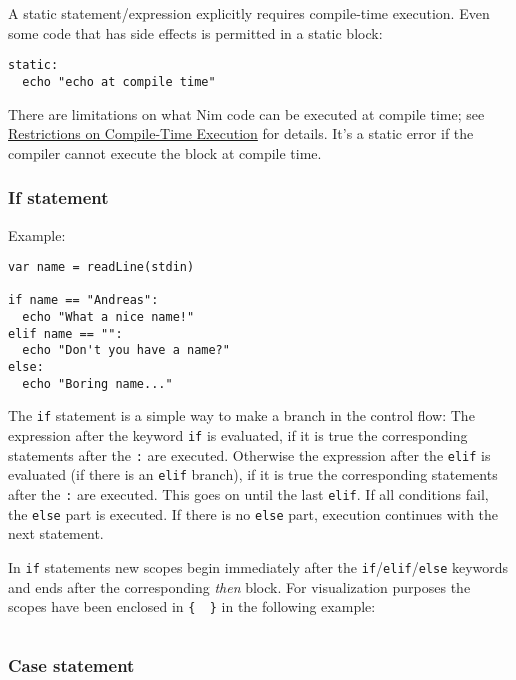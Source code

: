 A static statement/expression explicitly requires compile-time
execution. Even some code that has side effects is permitted in a static
block:

\begin{verbatim}
static:
  echo "echo at compile time"
\end{verbatim}

There are limitations on what Nim code can be executed at compile time;
see
\protect\hyperlink{restrictions-on-compileminustime-execution}{Restrictions
on Compile-Time Execution} for details. It's a static error if the
compiler cannot execute the block at compile time.

\hypertarget{if-statement}{%
\subsubsection{If statement}\label{if-statement}}

Example:

\begin{verbatim}
var name = readLine(stdin)

if name == "Andreas":
  echo "What a nice name!"
elif name == "":
  echo "Don't you have a name?"
else:
  echo "Boring name..."
\end{verbatim}

The \texttt{if} statement is a simple way to make a branch in the
control flow: The expression after the keyword \texttt{if} is evaluated,
if it is true the corresponding statements after the \texttt{:} are
executed. Otherwise the expression after the \texttt{elif} is evaluated
(if there is an \texttt{elif} branch), if it is true the corresponding
statements after the \texttt{:} are executed. This goes on until the
last \texttt{elif}. If all conditions fail, the \texttt{else} part is
executed. If there is no \texttt{else} part, execution continues with
the next statement.

In \texttt{if} statements new scopes begin immediately after the
\texttt{if}/\texttt{elif}/\texttt{else} keywords and ends after the
corresponding \emph{then} block. For visualization purposes the scopes
have been enclosed in \texttt{\{\textbar{}\ \ \textbar{}\}} in the
following example:

\begin{verbatim}
\end{verbatim}

\hypertarget{case-statement}{%
\subsubsection{Case statement}\label{case-statement}}

